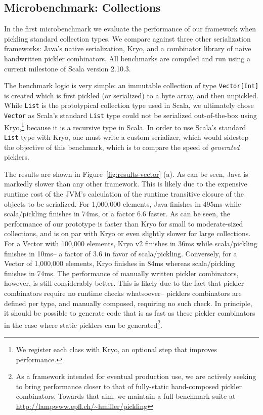\documentclass[preprint,10pt]{sigplanconf}
\theoremstyle{definition}
\theoremstyle{definition}
\begin{document}
\subsection{Microbenchmark: Collections}

In the first microbenchmark we evaluate the performance of our
framework when pickling standard collection types. We compare against
three other serialization frameworks: Java's native serialization,
Kryo, and a combinator library of naive handwritten pickler combinators. All
benchmarks are compiled and run using a current milestone of Scala version 2.10.3.

The benchmark logic is very simple: an immutable collection of type
\verb|Vector[Int]| is created which is first pickled (or serialized)
to a byte array, and then unpickled. While \verb|List| is the prototypical collection type used in Scala, we ultimately chose \verb|Vector| as
Scala's standard \verb|List| type could not be serialized out-of-the-box using Kryo,\footnote{We register each class with Kryo, an optional step that improves performance.} because it is a recursive type in Scala. In order to use Scala's standard \verb|List| type with Kryo, one must write a custom serializer, which would sidestep the objective of this benchmark, which is to compare the speed of {\em generated} picklers.

The results are
shown in Figure~\ref{fig:results-vector} (a). As can be seen, Java is markedly slower than any other framework. This is likely due to the expensive runtime cost of the JVM's calculation of the runtime transitive closure of the objects to be serialized. For 1,000,000 elements, Java finishes in 495ms while scala/pickling finishes in 74ms, or a factor 6.6 faster. As can be seen, the
performance of our prototype is faster than Kryo for small to moderate-sized collections, and is on par with Kryo or even slightly slower for large collections. For a Vector with 100,000 elements, Kryo v2 finishes in 36ms while scala/pickling finishes in 10ms-- a factor of 3.6 in favor of scala/pickling. Conversely, for a Vector of 1,000,000 elements, Kryo finishes in 84ms whereas scala/pickling finishes in 74ms. The
performance of manually written pickler combinators, however, is still
considerably better. This is likely due to the fact that pickler combinators require no runtime checks whatsoever-- picklers combinators are defined per type, and manually composed, requiring no such check. In principle, it should be possible to generate code
that is as fast as these pickler combinators in the case
where static picklers can be generated\footnote{As a framework intended for eventual production use, we are actively seeking to bring performance closer to that of fully-static hand-composed pickler combinators. Towards that aim, we maintain a full benchmark suite at \url{http://lampwww.epfl.ch/~hmiller/pickling}}.
\end{document}
